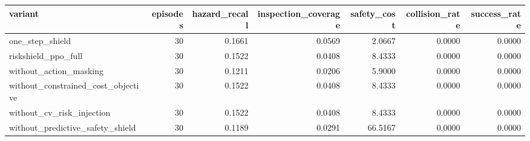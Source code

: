 \begin{tabular}{lrrrrrr}
\toprule
variant & episodes & hazard_recall & inspection_coverage & safety_cost & collision_rate & success_rate \\
\midrule
one_step_shield & 30 & 0.1661 & 0.0569 & 2.0667 & 0.0000 & 0.0000 \\
riskshield_ppo_full & 30 & 0.1522 & 0.0408 & 8.4333 & 0.0000 & 0.0000 \\
without_action_masking & 30 & 0.1211 & 0.0206 & 5.9000 & 0.0000 & 0.0000 \\
without_constrained_cost_objective & 30 & 0.1522 & 0.0408 & 8.4333 & 0.0000 & 0.0000 \\
without_cv_risk_injection & 30 & 0.1522 & 0.0408 & 8.4333 & 0.0000 & 0.0000 \\
without_predictive_safety_shield & 30 & 0.1189 & 0.0291 & 66.5167 & 0.0000 & 0.0000 \\
\bottomrule
\end{tabular}
